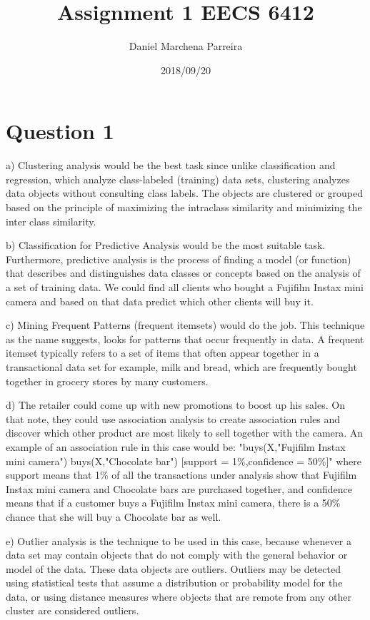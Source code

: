 \documentclass[a4paper]{article}
\title{Assignment 1 EECS 6412}
\author{Daniel Marchena Parreira}
\date{2018/09/20}
\begin{document}
\maketitle

\section*{Question 1}

a) Clustering analysis would be the best task since unlike classification and regression, which analyze class-labeled (training) data sets, clustering analyzes data objects without consulting class labels. The objects are clustered or grouped based on the principle of maximizing the intraclass similarity and minimizing the inter class similarity.

b) Classification for Predictive Analysis would be the most suitable task. Furthermore, predictive analysis is the process of finding a model (or function) that describes and distinguishes data classes or concepts based on the analysis of a set of training data. We could find all clients who bought a Fujifilm Instax mini camera and based on that data predict which other clients will buy it.

c) Mining Frequent Patterns (frequent itemsets) would do the job. This technique as the name suggests, looks for patterns that occur frequently in data. A frequent itemset typically refers to a set of items that often appear together in a transactional data set for example, milk and bread, which are frequently bought together in grocery stores by many customers.

d) The retailer could come up with new promotions to boost up his sales. On that note, they could use association analysis to create association rules and discover which other product are most likely to sell together with the camera. An example of an association rule in this case would be: "buys(X,"Fujifilm Instax mini camera") \textrightarrow buys(X,"Chocolate bar") [support = 1\%,confidence = 50\%]" where support means that 1\% of all the transactions under analysis show that Fujifilm Instax mini camera and Chocolate bars are purchased together, and confidence means that if a customer buys a Fujifilm Instax mini camera, there is a 50\% chance that she will buy a Chocolate bar as well.

e) Outlier analysis is the technique to be used in this case, because whenever a data set may contain objects that do not comply with the general behavior or model of the data. These data objects are outliers. Outliers may be detected using statistical tests that assume a distribution or probability model for the data, or using distance measures where objects that are remote from any other cluster are considered outliers.
\end{document}
